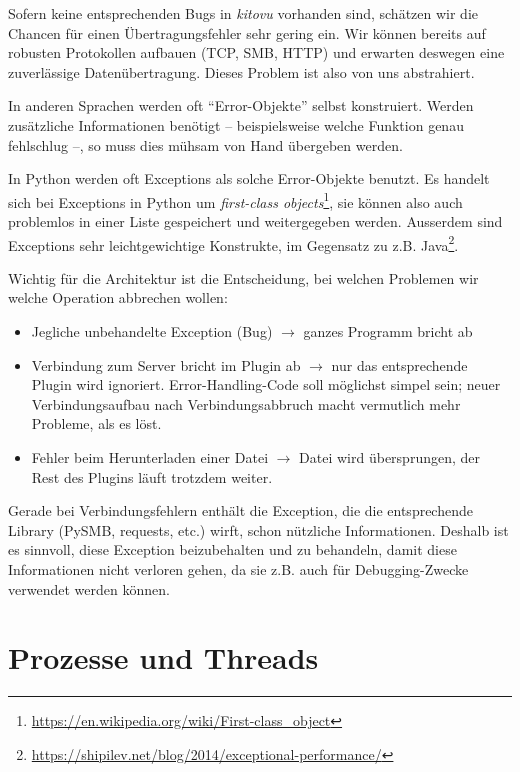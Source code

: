 \documentclass[a4paper]{article}
\let\oldsection\section
\renewcommand\section{\clearpage\oldsection}
\begin{document}
Sofern keine entsprechenden Bugs in \emph{kitovu} vorhanden sind, schätzen wir die
Chancen für einen Übertragungsfehler sehr gering ein. Wir können bereits auf robusten Protokollen aufbauen
(TCP, SMB, HTTP) und erwarten deswegen eine zuverlässige Datenübertragung. Dieses Problem ist also von uns abstrahiert.

In anderen Sprachen werden oft ``Error-Objekte'' selbst konstruiert. Werden
zusätzliche Informationen benötigt -- beispielsweise welche Funktion genau fehlschlug --, so muss dies mühsam von Hand übergeben werden.

In Python werden oft Exceptions als solche Error-Objekte benutzt. Es handelt
sich bei Exceptions in Python um \emph{first-class
  objects}\footnote{\url{https://en.wikipedia.org/wiki/First-class_object}}, sie
können also auch problemlos in einer Liste gespeichert und weitergegeben werden.
Ausserdem sind Exceptions sehr leichtgewichtige Konstrukte, im Gegensatz zu z.B.
Java\footnote{\url{https://shipilev.net/blog/2014/exceptional-performance/}}.

Wichtig für die Architektur ist die Entscheidung, bei welchen Problemen wir
welche Operation abbrechen wollen:

\begin{itemize}
  \item Jegliche unbehandelte Exception (Bug) $\rightarrow$ ganzes Programm bricht ab
  \item Verbindung zum Server bricht im Plugin ab $\rightarrow$ nur das
    entsprechende Plugin wird ignoriert. Error-Handling-Code soll möglichst
    simpel sein; neuer Verbindungsaufbau nach Verbindungsabbruch macht
    vermutlich mehr Probleme, als es löst.
  \item Fehler beim Herunterladen einer Datei $\rightarrow$ Datei wird
    übersprungen, der Rest des Plugins läuft trotzdem weiter.
\end{itemize}

Gerade bei Verbindungsfehlern enthält die Exception, die die entsprechende
Library (PySMB, requests, etc.) wirft, schon nützliche Informationen. Deshalb
ist es sinnvoll, diese Exception beizubehalten und zu behandeln, damit diese
Informationen nicht verloren gehen, da sie z.B. auch für Debugging-Zwecke verwendet werden können.

\section{Prozesse und Threads}
\end{document}
